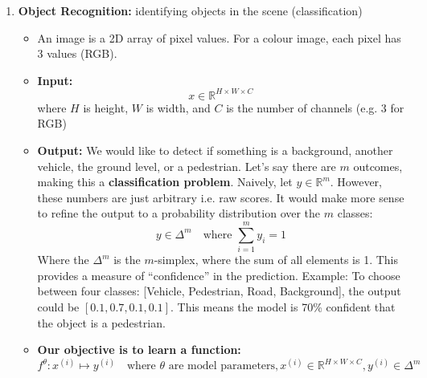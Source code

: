 \begin{enumerate}
    \item \textbf{Object Recognition: }identifying objects in the scene (classification)
          \begin{itemize}[noitemsep]
              \item An image is a 2D array of pixel values. For a colour image, each pixel has 3 values (RGB).
              \item \textbf{Input:}
                    \begin{equation}
                        x \in \mathbb{R}^{H \times W \times C}
                    \end{equation}
                    where $H$ is height, $W$ is width, and $C$ is the number of channels (e.g. 3 for RGB)
              \item \textbf{Output:} We would like to detect if something is a background, another vehicle, the ground level, or a pedestrian. Let's say there are $m$ outcomes, making this a \textbf{classification problem}. Naively, let
                    $y \in \mathbb{R}^m$. However, these numbers are just arbitrary i.e. raw scores. It would make more sense to refine the output to a probability distribution over the $m$ classes: \\
                    \begin{equation}
                        y \in \Delta^m \quad \text{where }\sum_{i=1}^{m} y_i = 1
                    \end{equation}
                    Where the $\Delta^m$ is the $m$-simplex, where the sum of all elements is 1. This provides a measure of ``confidence'' in the prediction. Example: To choose between four classes: [Vehicle, Pedestrian, Road, Background], the output could be $[0.1, 0.7, 0.1, 0.1]$. This means the model is 70\% confident that the object is a pedestrian.
              \item \textbf{Our objective is to learn a function:}
                    \begin{equation}
                        f^\theta : x^{(i)} \mapsto y^{(i)} \quad \text{where } \theta \text{ are model parameters}, x^{(i)} \in \mathbb{R}^{H \times W \times C}, y^{(i)} \in \Delta^m
                    \end{equation}
                    \begin{marginfigure}
                        \centering
                        \begin{tikzpicture}

\end{tikzpicture}
\end{marginfigure}
\end{itemize}
\end{enumerate}
